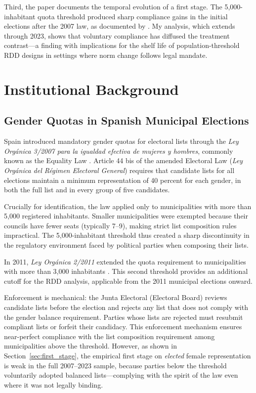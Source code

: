 \documentclass[12pt]{article}
\begin{document}
Third, the paper documents the temporal evolution of a first stage. The 5,000-inhabitant quota threshold produced sharp compliance gains in the initial elections after the 2007 law, as documented by \citet{bagues2021can}. My analysis, which extends through 2023, shows that voluntary compliance has diffused the treatment contrast---a finding with implications for the shelf life of population-threshold RDD designs in settings where norm change follows legal mandate.

\section{Institutional Background}

\subsection{Gender Quotas in Spanish Municipal Elections}

Spain introduced mandatory gender quotas for electoral lists through the \emph{Ley Org\'{a}nica 3/2007 para la igualdad efectiva de mujeres y hombres}, commonly known as the Equality Law \citep{ley2007}. Article 44 bis of the amended Electoral Law (\emph{Ley Org\'{a}nica del R\'{e}gimen Electoral General}) requires that candidate lists for all elections maintain a minimum representation of 40 percent for each gender, in both the full list and in every group of five candidates.

Crucially for identification, the law applied only to municipalities with more than 5,000 registered inhabitants. Smaller municipalities were exempted because their councils have fewer seats (typically 7--9), making strict list composition rules impractical. The 5,000-inhabitant threshold thus created a sharp discontinuity in the regulatory environment faced by political parties when composing their lists.

In 2011, \emph{Ley Org\'{a}nica 2/2011} extended the quota requirement to municipalities with more than 3,000 inhabitants \citep{ley2011}. This second threshold provides an additional cutoff for the RDD analysis, applicable from the 2011 municipal elections onward.

Enforcement is mechanical: the Junta Electoral (Electoral Board) reviews candidate lists before the election and rejects any list that does not comply with the gender balance requirement. Parties whose lists are rejected must resubmit compliant lists or forfeit their candidacy. This enforcement mechanism ensures near-perfect compliance with the list composition requirement among municipalities above the threshold. However, as shown in Section~\ref{sec:first_stage}, the empirical first stage on \emph{elected} female representation is weak in the full 2007--2023 sample, because parties below the threshold voluntarily adopted balanced lists---complying with the spirit of the law even where it was not legally binding.
\end{document}
